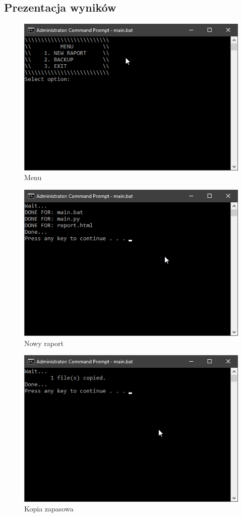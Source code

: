 \documentclass[]{article}
\begin{document}
\subsection{Prezentacja wyników}
\begin{figure}[H]
	\centering
	\includegraphics[width=0.7\linewidth]{prezentacja_1}
	\caption{Menu}
	\label{fig:p1}
\end{figure}
\begin{figure}[H]
	\centering
	\includegraphics[width=0.7\linewidth]{prezentacja_2}
	\caption{Nowy raport}
	\label{fig:p2}
\end{figure}
\begin{figure}[H]
	\centering
	\includegraphics[width=0.7\linewidth]{prezentacja_3}
	\caption{Kopia zapasowa}
	\label{fig:p3}
\end{figure}
\end{document}
